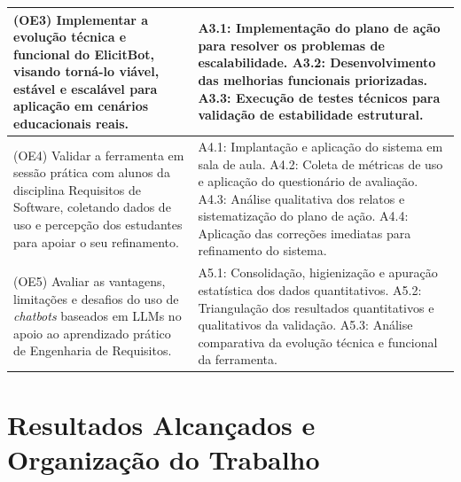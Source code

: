 {\begin{xltabular}{\textwidth}{|X|X|}
    (OE3) Implementar a evolução técnica e funcional do ElicitBot, visando torná-lo viável, estável e escalável para aplicação em cenários educacionais reais. & 
    A3.1: Implementação do plano de ação para resolver os problemas de escalabilidade. \newline
    A3.2: Desenvolvimento das melhorias funcionais priorizadas. \newline
    A3.3: Execução de testes técnicos para validação de estabilidade estrutural. \\
    \midrule
    
    (OE4) Validar a ferramenta em sessão prática com alunos da disciplina Requisitos de Software, coletando dados de uso e percepção dos estudantes para apoiar o seu refinamento. & 
    A4.1: Implantação e aplicação do sistema em sala de aula. \newline
    A4.2: Coleta de métricas de uso e aplicação do questionário de avaliação. \newline
    A4.3: Análise qualitativa dos relatos e sistematização do plano de ação. \newline
    A4.4: Aplicação das correções imediatas para refinamento do sistema. \\
    \midrule
    
    (OE5) Avaliar as vantagens, limitações e desafios do uso de \textit{chatbots} baseados em LLMs no apoio ao aprendizado prático de Engenharia de Requisitos. & 
    A5.1: Consolidação, higienização e apuração estatística dos dados quantitativos. \newline
    A5.2: Triangulação dos resultados quantitativos e qualitativos da validação. \newline
    A5.3: Análise comparativa da evolução técnica e funcional da ferramenta. \\
\end{xltabular}
}

\section{Resultados Alcançados e Organização do Trabalho}

